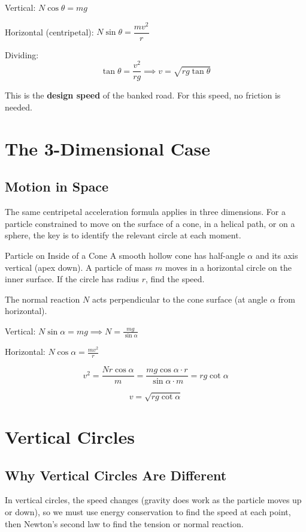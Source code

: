\documentclass[12pt, a4paper]{book}
\begin{document}
Vertical: $N\cos\theta = mg$

Horizontal (centripetal): $N\sin\theta = \dfrac{mv^2}{r}$

Dividing:
\[
  \tan\theta = \frac{v^2}{rg} \implies v = \sqrt{rg\tan\theta}
\]

This is the \textbf{design speed} of the banked road. For this speed, no friction is needed.

\section{The 3-Dimensional Case}

\subsection{Motion in Space}

The same centripetal acceleration formula applies in three dimensions. For a particle constrained to move on the surface of a cone, in a helical path, or on a sphere, the key is to identify the relevant circle at each moment.

\begin{exmp}{Particle on Inside of a Cone}{}
A smooth hollow cone has half-angle $\alpha$ and its axis vertical (apex down). A particle of mass $m$ moves in a horizontal circle on the inner surface. If the circle has radius $r$, find the speed.

The normal reaction $N$ acts perpendicular to the cone surface (at angle $\alpha$ from horizontal).

Vertical: $N\sin\alpha = mg \implies N = \frac{mg}{\sin\alpha}$

Horizontal: $N\cos\alpha = \frac{mv^2}{r}$

\[
  v^2 = \frac{Nr\cos\alpha}{m} = \frac{mg\cos\alpha \cdot r}{\sin\alpha \cdot m} = rg\cot\alpha
\]

\[
  v = \sqrt{rg\cot\alpha}
\]
\end{exmp}

\section{Vertical Circles}

\subsection{Why Vertical Circles Are Different}

In vertical circles, the speed changes (gravity does work as the particle moves up or down), so we must use energy conservation to find the speed at each point, then Newton's second law to find the tension or normal reaction.
\end{document}
